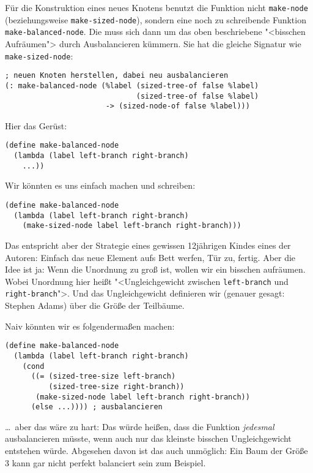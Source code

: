 %
Für die Konstruktion eines neues Knotens benutzt die Funktion nicht
\lstinline{make-node} (beziehungsweise \lstinline{make-sized-node}),
sondern eine noch zu schreibende Funktion
\lstinline{make-balanced-node}. Die muss sich dann um das oben
beschriebene "<bisschen Aufräumen"> durch Ausbalancieren kümmern.  Sie
hat die gleiche Signatur wie \lstinline{make-sized-node}:
%
\begin{lstlisting}
; neuen Knoten herstellen, dabei neu ausbalancieren
(: make-balanced-node (%label (sized-tree-of false %label)
                              (sized-tree-of false %label)
                       -> (sized-node-of false %label)))
\end{lstlisting}
%
Hier das Gerüst:
%
\begin{lstlisting}
(define make-balanced-node
  (lambda (label left-branch right-branch)
    ...))
\end{lstlisting}
%
Wir könnten es uns einfach machen und schreiben:
%
\begin{lstlisting}
(define make-balanced-node
  (lambda (label left-branch right-branch)
    (make-sized-node label left-branch right-branch)))
\end{lstlisting}
%
Das entspricht aber der Strategie eines gewissen 12jährigen Kindes
eines der Autoren: Einfach das neue Element aufs Bett werfen, Tür zu,
fertig.  Aber die Idee ist ja: Wenn die Unordnung zu groß ist, wollen
wir ein bisschen aufräumen.  Wobei Unordnung hier heißt
"<Ungleichgewicht zwischen \lstinline{left-branch} und
\lstinline{right-branch}">.  Und das Ungleichgewicht definieren wir
(genauer gesagt: Stephen Adams) über die Größe der Teilbäume.

Naiv könnten wir es folgendermaßen machen:
%
\begin{lstlisting}
(define make-balanced-node
  (lambda (label left-branch right-branch)
    (cond
      ((= (sized-tree-size left-branch)
          (sized-tree-size right-branch))
       (make-sized-node label left-branch right-branch))
      (else ...)))) ; ausbalancieren
\end{lstlisting}
%
\ldots~aber das wäre zu hart: Das würde heißen, dass die Funktion
\emph{jedesmal} ausbalancieren müsste, wenn auch nur das kleinste
bisschen Ungleichgewicht entstehen würde.  Abgesehen davon ist das
auch unmöglich: Ein Baum der Größe 3 kann gar nicht perfekt balanciert
sein zum Beispiel.

